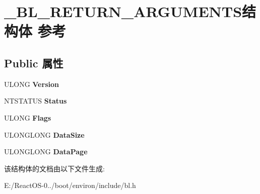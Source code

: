 \hypertarget{struct___b_l___r_e_t_u_r_n___a_r_g_u_m_e_n_t_s}{}\section{\+\_\+\+B\+L\+\_\+\+R\+E\+T\+U\+R\+N\+\_\+\+A\+R\+G\+U\+M\+E\+N\+T\+S结构体 参考}
\label{struct___b_l___r_e_t_u_r_n___a_r_g_u_m_e_n_t_s}
\subsection*{Public 属性}
\begin{DoxyCompactItemize}
\item 
\mbox{\label{struct___b_l___r_e_t_u_r_n___a_r_g_u_m_e_n_t_s_a57795ae3af67227bea9e9d1a652550e8}} 
U\+L\+O\+NG {\bfseries Version}
\item 
\mbox{\label{struct___b_l___r_e_t_u_r_n___a_r_g_u_m_e_n_t_s_a847297e10b41515d66ea5964e8891b64}} 
N\+T\+S\+T\+A\+T\+US {\bfseries Status}
\item 
\mbox{\label{struct___b_l___r_e_t_u_r_n___a_r_g_u_m_e_n_t_s_aca8581bce98f253e0937bb55e6c0be98}} 
U\+L\+O\+NG {\bfseries Flags}
\item 
\mbox{\label{struct___b_l___r_e_t_u_r_n___a_r_g_u_m_e_n_t_s_ac1b0f7bc5ec4ff84f938baa68869bafc}} 
U\+L\+O\+N\+G\+L\+O\+NG {\bfseries Data\+Size}
\item 
\mbox{\label{struct___b_l___r_e_t_u_r_n___a_r_g_u_m_e_n_t_s_a5fe4dd0f97df79df237f07055dedef47}} 
U\+L\+O\+N\+G\+L\+O\+NG {\bfseries Data\+Page}
\end{DoxyCompactItemize}


该结构体的文档由以下文件生成\+:\begin{DoxyCompactItemize}
\item 
E\+:/\+React\+O\+S-\/0../boot/environ/include/bl.\+h\end{DoxyCompactItemize}
